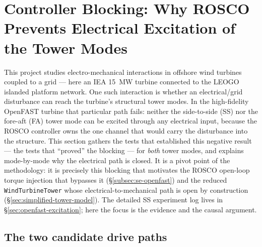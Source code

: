 
\section{Controller Blocking: Why ROSCO Prevents Electrical Excitation of the Tower Modes}
\label{sec:rosco-blocking}

This project studies electro-mechanical interactions in offshore wind turbines
coupled to a grid --- here an IEA \SI{15}{\mega\watt} turbine connected to the
LEOGO islanded platform network. One such interaction is whether an
electrical/grid disturbance can reach the turbine's structural tower modes. In
the high-fidelity OpenFAST turbine that particular path fails: neither the
side-to-side (SS) nor the fore-aft (FA) tower mode can be excited through any
electrical input, because the ROSCO controller owns the one channel that would
carry the disturbance into the structure. This section gathers
the tests that established this negative result --- the tests that ``proved'' the
blocking --- for \emph{both} tower modes, and explains mode-by-mode why the
electrical path is closed. It is a pivot point of the methodology: it is precisely
this blocking that motivates the ROSCO open-loop torque injection that bypasses it
(\S\ref{subsec:se-openfast}) and the reduced \texttt{WindTurbineTower} whose
electrical-to-mechanical path is open by construction
(\S\ref{sec:simplified-tower-model}). The detailed SS experiment log lives in
\S\ref{sec:openfast-excitation}; here the focus is the evidence and the causal
argument.

\subsection{The two candidate drive paths}
\label{subsec:rb-paths}

